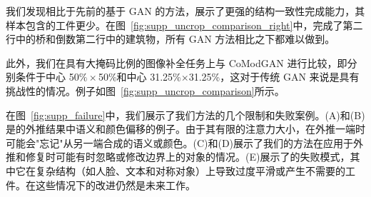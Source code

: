 我们发现相比于先前的基于 GAN 的方法，\model 展示了更强的结构一致性完成能力，其样本包含的工件更少。在图~\ref{fig:supp_uncrop_comparison_right}中，\model 完成了第二行中的桥和倒数第二行中的建筑物，所有 GAN 方法相比之下都难以做到。



此外，我们在具有大掩码比例的图像补全任务上与 CoModGAN 进行比较，即分别条件于中心 50$\%\times$50\%和中心 31.25\%$\times$31.25\%，这对于传统 GAN 来说是具有挑战性的情况。例子如图~\ref{fig:supp_uncrop_comparison}所示。



\label{sec:supp_limitations}

在图~\ref{fig:supp_failure}中，我们展示了我们方法的几个限制和失败案例。(A)和(B)是\model 的外推结果中语义和颜色偏移的例子。由于其有限的注意力大小，\model 在外推一端时可能会"忘记"从另一端合成的语义或颜色。(C)和(D)展示了我们的方法在应用于外推和修复时可能有时忽略或修改边界上的对象的情况。(E)展示了\model 的失败模式，其中它在复杂结构（如人脸、文本和对称对象）上导致过度平滑或产生不需要的工件。在这些情况下的改进仍然是未来工作。 

